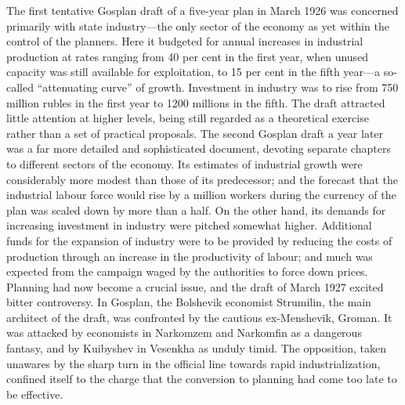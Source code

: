 The first tentative Gosplan draft of a five-year plan in March 1926 was concerned primarily with state industry---the only sector of the economy as yet within the control of the planners. Here it budgeted for annual increases in industrial production at rates ranging from 40 per cent in the first year, when unused capacity was still available for exploitation, to 15 per cent in the fifth year---a so-called ``attenuating curve'' of growth. Investment in industry was to rise from 750 million rubles in the first year to 1200 millions in the fifth. The draft attracted little attention at higher levels, being still regarded as a theoretical exercise rather than a set of practical proposals. The second Gosplan draft a year later was a far more detailed and sophisticated document, devoting separate chapters to different sectors of the economy. Its estimates of industrial growth were considerably more modest than those of its predecessor; and the forecast that the industrial labour force would rise by a million workers during the currency of the plan was scaled down by more than a half. On the other hand, its demands for increasing investment in industry were pitched somewhat higher. Additional funds for the expansion of industry were to be provided by reducing the costs of production through an increase in the productivity of labour; and much was expected from the campaign waged by the authorities to force down prices. Planning had now become a crucial issue, and the draft of March 1927 excited bitter controversy. In Gosplan, the Bolshevik economist Strumilin, the main architect of the draft, was confronted by the cautious ex-Menshevik, Groman. It was attacked by economists in Narkomzem and Narkomfin as a dangerous fantasy, and by Kuibyshev in Vesenkha as unduly timid. The opposition, taken unawares by the sharp turn in the official line towards rapid industrialization, confined itself to the charge that the conversion to planning had come too late to be effective. 


